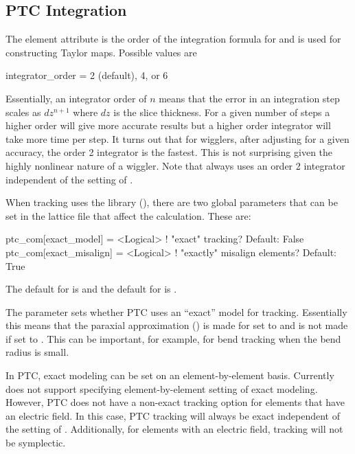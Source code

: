 \subsection{PTC Integration}
\label{s:ptc.integ}

The  element attribute is the order of the integration formula for
 and is used for constructing Taylor maps. Possible values are
\begin{example}
  integrator_order = 2 (default), 4, or 6
\end{example}
Essentially, an integrator order of $n$ means that the error in an integration step scales as
$dz^{n+1}$ where $dz$ is the slice thickness.  For a given number of steps a higher order will give
more accurate results but a higher order integrator will take more time per step. It turns out that
for wigglers, after adjusting  for a given accuracy, the order 2 integrator is the
fastest. This is not surprising given the highly nonlinear nature of a wiggler. Note that
 always uses an order 2 integrator independent of the setting of
.

When tracking uses the  library (), there are two global parameters that
can be set in the lattice file that affect the calculation. These are:
\begin{example}
  ptc_com[exact_model]    = <Logical>  ! "exact" tracking? Default: False
  ptc_com[exact_misalign] = <Logical>  ! "exactly" misalign elements? Default: True
\end{example}
The default for  is  and the default for  is .

The  parameter sets whether PTC uses an ``exact'' model for
tracking. Essentially this means that the paraxial approximation () is made
for  set to  and is not made if set to . This can be
important, for example, for bend tracking when the bend radius is small.

In PTC, exact modeling can be set on an element-by-element basis. Currently \bmad does not support
specifying element-by-element setting of exact modeling. However, PTC does not have a non-exact
tracking option for elements that have an electric field. In this case, PTC tracking will always be
exact independent of the setting of .  Additionally, for elements with an
electric field, tracking will not be symplectic.

